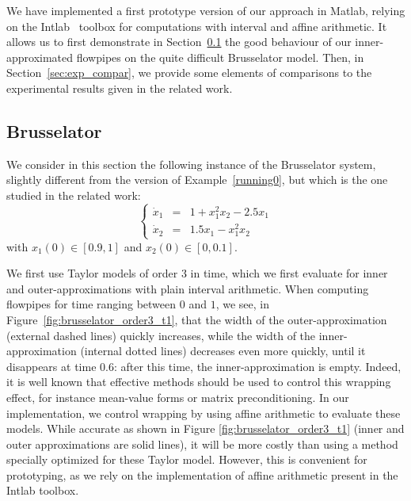 We have implemented a first prototype version of our approach in Matlab, relying on the Intlab~\cite{Ru99a} 
toolbox for computations with interval and affine arithmetic.
It allows us to first demonstrate in Section~\ref{sec:exp_bruss} the good behaviour of our inner-approximated flowpipes
 on the quite difficult Brusselator model. %
Then, in Section~\ref{sec:exp_compar}, we provide some elements of comparisons to the experimental results 
given in the related work. 
 
\subsection{Brusselator}
\label{sec:exp_bruss}

We consider in this section the following instance of the Brusselator system, slightly different  from the version of  Example~\ref{running0}, but
which is the one studied in the related work:
$$\left\{\begin{array}{rcl}
\dot{x}_1 & = & 1+x_1^2x_2-2.5x_1 \\
\dot{x}_2 & = & 1.5x_1-x_1^2x_2
\end{array}\right.$$
\noindent with $x_1(0) \in [0.9,1]$ and $x_2(0) \in [0,0.1]$.

We first use Taylor models of order 3 in time, which we first evaluate for inner and outer-approximations 
with plain interval arithmetic. When computing flowpipes for time ranging between $0$ and $1$, 
we see, in Figure~\ref{fig:brusselator_order3_t1}, that the width of the outer-approximation 
(external dashed lines) quickly increases, while the 
width of the inner-approximation (internal dotted lines) decreases even more quickly, 
until it disappears at time 0.6: after this time, the inner-approximation is empty. Indeed, it is well 
known that effective methods should be used to control this wrapping effect, for instance mean-value 
forms or matrix preconditioning. In our implementation, we control wrapping by using 
affine arithmetic to evaluate these models. While accurate as shown in Figure \ref{fig:brusselator_order3_t1} (inner
and outer approximations are solid lines), it will be more costly than using 
a method specially optimized for these Taylor model. 
However, this is convenient for prototyping, 
as we rely on the implementation of affine arithmetic present in the Intlab 
toolbox.
 
